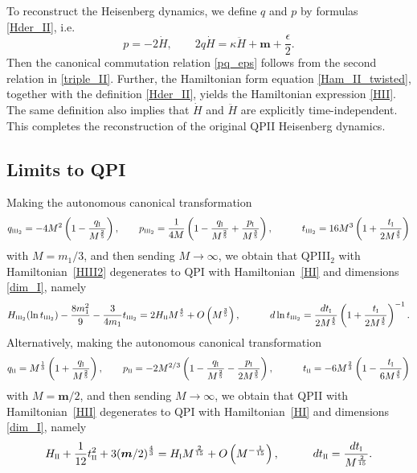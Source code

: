 \documentclass[12pt,a4paper]{article}
\numberwithin{equation}{section}
\newcommand{\III}{\scalebox{.6}{III}}
\newcommand{\II}{\scalebox{.6}{II}}
\newcommand{\I}{\scalebox{.6}{I}}
\begin{document}
To reconstruct the Heisenberg dynamics, we define $q$ and $p$ by formulas \eqref{Hder_II}, i.e.
\begin{equation}\label{pq_dict_II}
p=-2\dot{H}, \qquad 2q\dot{H}=\kappa\ddot{H}+\boldsymbol{m}+\frac{\epsilon}2.
\end{equation}
Then the canonical commutation relation \eqref{pq_eps} follows from the second relation in \eqref{triple_II}. Further, the Hamiltonian form equation \eqref{Ham_II_twisted}, together with the definition \eqref{Hder_II}, yields the Hamiltonian expression \eqref{HII}. The same definition also implies that $\dot{H}$ and $\ddot{H}$ are explicitly time-independent. This completes the reconstruction of the original QPII Heisenberg dynamics.

 \subsection{Limits to QPI}
 Making the autonomous canonical transformation 
 \begin{equation}
 q_{\III_2}=-4M^2\left(1-\frac{q_{\I}} {M^{\frac25}}\right), \qquad p_{\III_2}=\frac1{4M}\left(1-\frac{q_{\I}}{M^{\frac25}}+\frac{p_{\I}}{M^{\frac35}}\right), \qquad  \quad t_{\III_2}=16M^3\left(1+\frac{t_{\I}}{2M^{\frac45}}\right)
 \end{equation} 
 with $M=m_1/3$, and then sending $M\rightarrow\infty$, we obtain that QPIII$_2$ with Hamiltonian~\eqref{HIII2} degenerates to QPI with Hamiltonian~\eqref{HI} and dimensions \eqref{dim_I}, namely
\begin{equation}
H_{\III_2}(\ln t_{\III_2})-\frac{8m_1^2}9-\frac3{4m_1}t_{\III_2}=2H_{\II}M^{\frac45}+O\left(M^{\frac35}\right), \qquad \quad  d\ln t_{\III_2}=\frac{dt_{\I}}{2M^{\frac45}}\left(1+\frac{t_{\I}}{2M^{\frac45}}\right)^{-1}.    
\end{equation}
Alternatively, making the autonomous canonical transformation
\begin{equation} q_{\II}=M^{\frac13}\left(1+\frac{q_{\I}}{M^{\frac25}}\right), \qquad p_{\II}=-2M^{2/3}\left(1-\frac{q_{\I}}{M^{\frac25}}-\frac{p_{\I}}{2M^{\frac35}}\right), \qquad \quad t_{\II}=-6M^{\frac23}\left(1-\frac{t_{\I}}{6M^{\frac45}}\right)  
\end{equation}
with $M=\boldsymbol{m}/2$, and then sending $M\rightarrow\infty$, we obtain that QPII with Hamiltonian~\eqref{HII} degenerates to QPI with Hamiltonian~\eqref{HI} and dimensions \eqref{dim_I}, namely
\begin{equation}
H_{\II}+\frac1{12}t_{\II}^2+3(\boldsymbol{m}/2)^{\frac43}=H_{\I}M^{\frac2{15}}+O\left(M^{-\frac1{15}}\right), \qquad \quad  dt_{\II}=\frac{dt_{\I}}{M^{\frac2{15}}}.
\end{equation}
\end{document}
